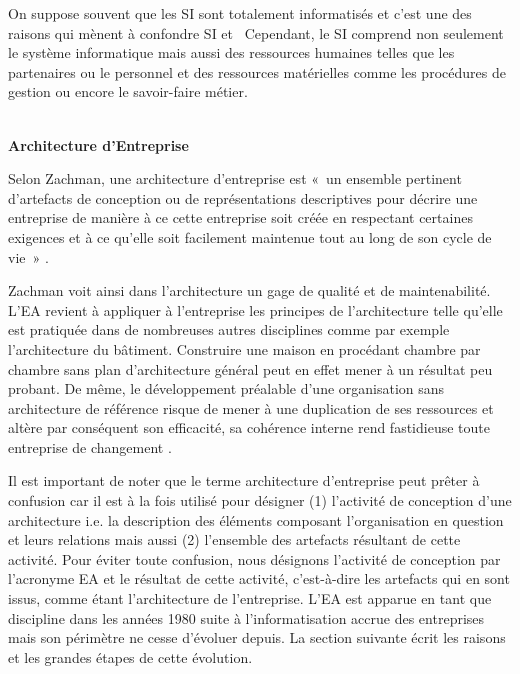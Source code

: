 On suppose souvent que les SI sont totalement informatisés et c'est une des 
raisons qui mènent à confondre SI et \ Cependant, le SI comprend non seulement 
le système informatique mais aussi des ressources humaines telles que les 
partenaires ou le personnel et des ressources matérielles comme les procédures 
de gestion ou encore le savoir-faire métier.
\\\

\textbf{Architecture d'Entreprise}

Selon Zachman, une architecture d'entreprise est «~un ensemble pertinent 
d'artefacts de conception ou de représentations descriptives pour décrire une 
entreprise de manière à ce cette entreprise soit créée en respectant certaines 
exigences et à ce qu'elle soit facilement maintenue tout au long de son cycle de 
vie~» \cite{zachman1997enterprise}. 

Zachman voit ainsi dans l'architecture un gage de qualité et de maintenabilité. 
L'EA revient à appliquer à l'entreprise les principes de l'architecture telle 
qu'elle est pratiquée dans de nombreuses autres disciplines comme par exemple 
l'architecture du bâtiment. Construire une maison en procédant chambre par 
chambre sans plan d'architecture général peut en effet mener à un résultat peu 
probant. De même, le développement préalable d'une organisation sans 
architecture de référence risque de mener à une duplication de ses ressources et 
altère par conséquent son efficacité, sa cohérence interne rend fastidieuse 
toute entreprise de changement \cite{zachman1997enterprise} 
\cite{bernard2012introduction}. 

Il est important de noter que le terme architecture d'entreprise peut prêter à 
confusion car il est à la fois utilisé pour désigner (1) l'activité de 
conception d'une architecture i.e. la description des éléments composant 
l'organisation en question et leurs relations mais aussi (2) l'ensemble des 
artefacts résultant de cette activité. Pour éviter toute confusion, nous 
désignons l'activité de conception par l'acronyme EA et le résultat de cette 
activité, c'est-à-dire les artefacts qui en sont issus, comme étant 
l'architecture de l'entreprise. L'EA est apparue en tant que discipline dans 
les années 1980 suite à l'informatisation accrue des entreprises mais son 
périmètre ne cesse d'évoluer depuis. La section suivante écrit les raisons et 
les grandes étapes de cette évolution. 



